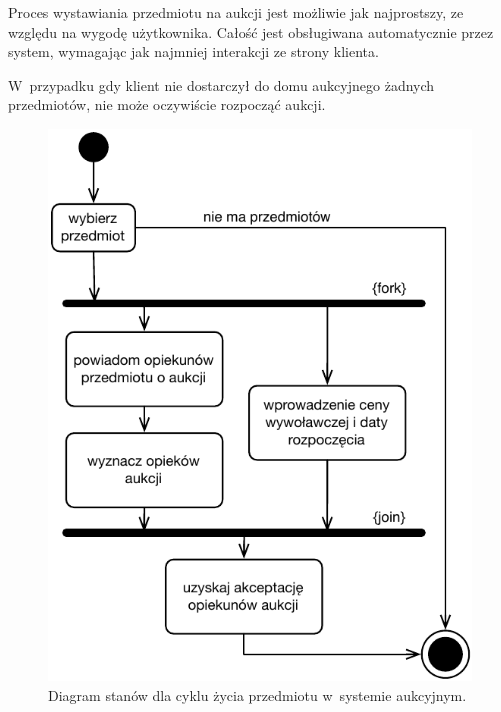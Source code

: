 \documentclass[10pt,a4paper]{article}
\begin{document}
Proces wystawiania przedmiotu na aukcji jest możliwie jak najprostszy, ze
względu na wygodę użytkownika. Całość jest obsługiwana automatycznie przez
system, wymagając jak najmniej interakcji ze strony klienta.

W~przypadku gdy klient nie dostarczył do domu aukcyjnego żadnych przedmiotów,
nie może oczywiście rozpocząć aukcji.

\vspace{40pt}
\begin{figure}[hb]
  \begin{adjustwidth}{-3cm}{-3cm}
    \centering
    \includegraphics{figury/aktywnosc-nowa-aukcja}
    \caption{Diagram stanów dla cyklu życia przedmiotu w~systemie aukcyjnym.}
    \label{fig:aktywnosc_nowa_aukcja}
  \end{adjustwidth}
\end{figure}
\end{document}
